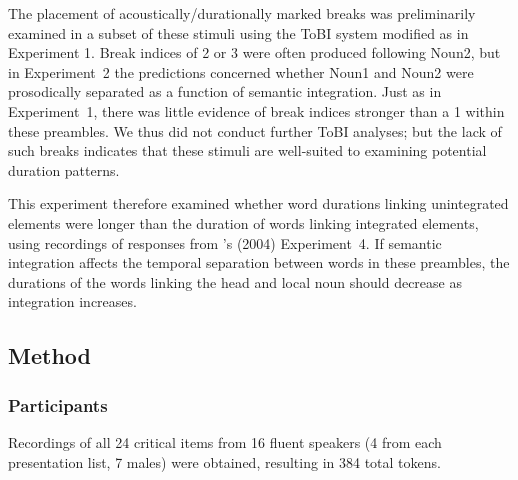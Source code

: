 \documentclass[12pt,titlepage]{article}
\newcommand{\IGNORE}[1]{} %
\begin{document}
The placement of acoustically/durationally marked breaks was preliminarily examined in a subset of these stimuli using the ToBI system \cite{TOBI} modified as in Experiment 1. Break indices of 2 or 3 were often produced following Noun2, but in Experiment~2 the predictions concerned whether Noun1 and Noun2  were prosodically separated as a function of semantic integration. Just as in Experiment~1, there was little evidence of break indices stronger than a 1 within these preambles.  We thus did not conduct further ToBI analyses; but the lack of such breaks indicates that these stimuli are well-suited to examining potential duration patterns.

This experiment therefore examined whether word durations linking unintegrated elements were longer than the duration of words linking integrated elements, using recordings of responses from \citeauthor{SolomonPearlmutter04}'s (2004) Experiment~4. If semantic integration affects the temporal separation between words in these preambles, the durations of the words linking the head and local noun should decrease as integration increases.


\IGNORE{As in Experiment~1, three types of control predictors were included in the models : (1) speech rate, (2) phonological context, and (3) predictability/accessibility.  The exact controls included in each model are shown in Table~\ref{PredictorTable} and described in detail below. }


\subsection{Method}

\subsubsection{Participants} Recordings of all 24 critical items from 16 fluent speakers (4 from each presentation list, 7 males) were obtained, resulting in 384 total tokens. 
\end{document}
